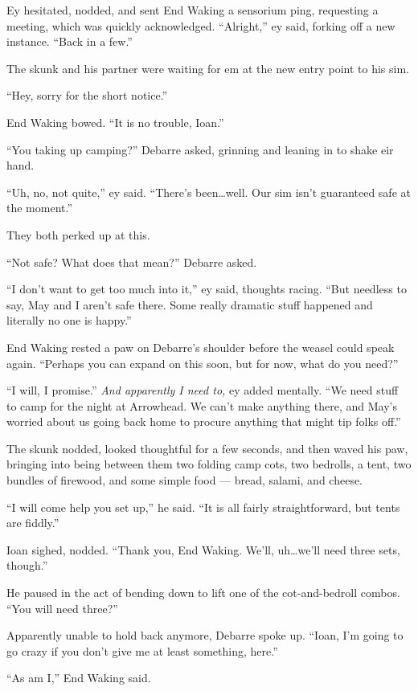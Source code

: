 Ey hesitated, nodded, and sent End Waking a sensorium ping, requesting a meeting, which was quickly acknowledged. ``Alright,'' ey said, forking off a new instance. ``Back in a few.''

The skunk and his partner were waiting for em at the new entry point to his sim.

``Hey, sorry for the short notice.''

End Waking bowed. ``It is no trouble, Ioan.''

``You taking up camping?'' Debarre asked, grinning and leaning in to shake eir hand.

``Uh, no, not quite,'' ey said. ``There's been\ldots well. Our sim isn't guaranteed safe at the moment.''

They both perked up at this.

``Not safe? What does that mean?'' Debarre asked.

``I don't want to get too much into it,'' ey said, thoughts racing. ``But needless to say, May and I aren't safe there. Some really dramatic stuff happened and literally no one is happy.''

End Waking rested a paw on Debarre's shoulder before the weasel could speak again. ``Perhaps you can expand on this soon, but for now, what do you need?''

``I will, I promise.'' \emph{And apparently I need to,} ey added mentally. ``We need stuff to camp for the night at Arrowhead. We can't make anything there, and May's worried about us going back home to procure anything that might tip folks off.''

The skunk nodded, looked thoughtful for a few seconds, and then waved his paw, bringing into being between them two folding camp cots, two bedrolls, a tent, two bundles of firewood, and some simple food — bread, salami, and cheese.

``I will come help you set up,'' he said. ``It is all fairly straightforward, but tents are fiddly.''

Ioan sighed, nodded. ``Thank you, End Waking. We'll, uh\ldots we'll need three sets, though.''

He paused in the act of bending down to lift one of the cot-and-bedroll combos. ``You will need three?''

Apparently unable to hold back anymore, Debarre spoke up. ``Ioan, I'm going to go crazy if you don't give me at least something, here.''

``As am I,'' End Waking said.

